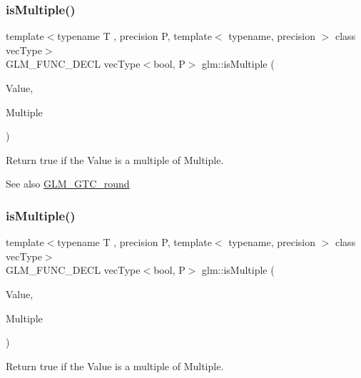\subsubsection{\texorpdfstring{is\+Multiple()}{isMultiple()}\hspace{0.1cm}{\footnotesize\ttfamily [2/3]}}
{\footnotesize\ttfamily template$<$typename T , precision P, template$<$ typename, precision $>$ class vec\+Type$>$ \\
G\+L\+M\+\_\+\+F\+U\+N\+C\+\_\+\+D\+E\+CL vec\+Type$<$bool, P$>$ glm\+::is\+Multiple (\begin{DoxyParamCaption}\item[{vec\+Type$<$ T, P $>$ const \&}]{Value,  }\item[{T}]{Multiple }\end{DoxyParamCaption})}

Return true if the \textquotesingle{}Value\textquotesingle{} is a multiple of \textquotesingle{}Multiple\textquotesingle{}.

\begin{DoxySeeAlso}{See also}
\hyperlink{group__gtc__round}{G\+L\+M\+\_\+\+G\+T\+C\+\_\+round} 
\end{DoxySeeAlso}
\mbox{\label{group__gtc__round_ga7ae705574ef3e3ebfb4f537d8d285c48}} 
\subsubsection{\texorpdfstring{is\+Multiple()}{isMultiple()}\hspace{0.1cm}{\footnotesize\ttfamily [3/3]}}
{\footnotesize\ttfamily template$<$typename T , precision P, template$<$ typename, precision $>$ class vec\+Type$>$ \\
G\+L\+M\+\_\+\+F\+U\+N\+C\+\_\+\+D\+E\+CL vec\+Type$<$bool, P$>$ glm\+::is\+Multiple (\begin{DoxyParamCaption}\item[{vec\+Type$<$ T, P $>$ const \&}]{Value,  }\item[{vec\+Type$<$ T, P $>$ const \&}]{Multiple }\end{DoxyParamCaption})}

Return true if the \textquotesingle{}Value\textquotesingle{} is a multiple of \textquotesingle{}Multiple\textquotesingle{}.

